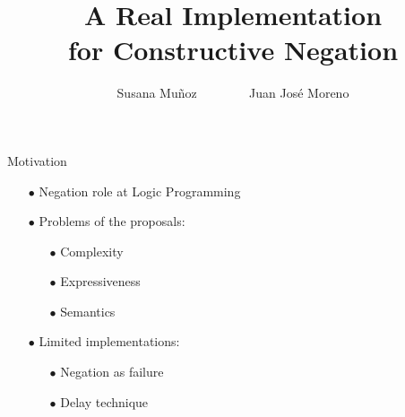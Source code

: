 \documentclass[pdf,slideColor,contemporain]{prosper}
\title{\black A Real Implementation \\
        for Constructive Negation}
\author{Susana Mu\~{n}oz ~~~~~~~ Juan Jos\'{e} Moreno}
\begin{document}
\maketitle
\begin{slide}{Motivation}
\vspace{0.3cm}
     \begin{itemize}
        \item[{\blue $\bullet$}] Negation {\blue role} at Logic Programming
        \item[{\blue $\bullet$}] Problems of the {\blue proposals}:
              \begin{itemize}
                \item[$\bullet$] Complexity
                \item[$\bullet$] Expressiveness
                \item[$\bullet$] Semantics
              \end{itemize}
        \item[{\blue $\bullet$}] Limited {\blue implementations}:
              \begin{itemize}
                \item[$\bullet$] Negation as failure
                \item[$\bullet$] Delay technique
              \end{itemize}
     \end{itemize}
\end{slide}
\end{document}
